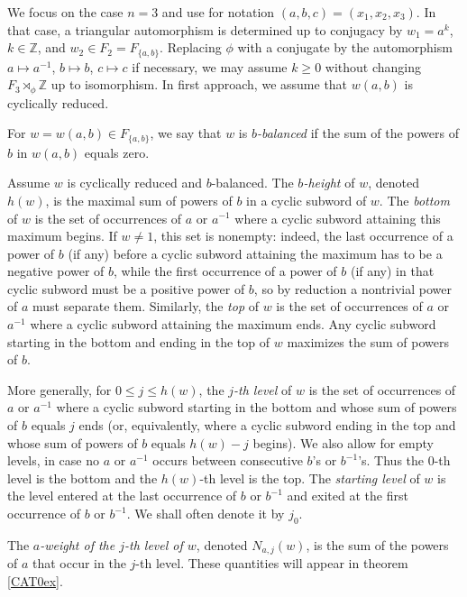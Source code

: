 \documentclass  [a4paper, 11pts] {article}
\newcommand{\Z}{\mathbb{Z}}
\begin{document}
We focus on the case $n=3$ and use for notation $(a, b, c) = (x_1, x_2, x_3)$. In that case, a triangular automorphism is determined up to conjugacy by $w_1 = a^k$, $k\in \Z$, and $w_2\in F_2 = F_{\{a, b\}}$. Replacing $\phi$ with a conjugate by the automorphism $a\mapsto a^{-1}$, $b\mapsto b$, $c\mapsto c$ if necessary, we may assume $k\ge 0$ without changing $F_3\rtimes_\phi\Z$ up to isomorphism. In first approach, we assume that $w(a,b)$ is cyclically reduced.

For $w = w(a, b)\in F_{\{a, b\}}$, we say that $w$ is \emph{$b$-balanced} if the sum of the powers of $b$ in $w(a, b)$ equals zero.

Assume $w$ is cyclically reduced and $b$-balanced. The \emph{$b$-height} of $w$, denoted $h(w)$, is the maximal sum of powers of $b$ in a cyclic subword of $w$. The \emph{bottom} of $w$ is the set of occurrences of $a$ or $a^{-1}$ where a cyclic subword attaining this maximum begins. If $w\ne 1$, this set is nonempty: indeed, the last occurrence of a power of $b$ (if any) before a cyclic subword attaining the maximum has to be a negative power of $b$, while the first occurrence of a power of $b$ (if any) in that cyclic subword must be a positive power of $b$, so by reduction a nontrivial power of $a$ must separate them. Similarly, the \emph{top} of $w$ is the set of occurrences of $a$ or $a^{-1}$ where a cyclic subword attaining the maximum ends. Any cyclic subword starting in the bottom and ending in the top of $w$ maximizes the sum of powers of $b$.

More generally, for $0\le j\le h(w)$, the \emph{$j$-th level} of $w$ is the set of occurrences of $a$ or $a^{-1}$ where a cyclic subword starting in the bottom and whose sum of powers of $b$ equals $j$ ends (or, equivalently, where a cyclic subword ending in the top and whose sum of powers of $b$ equals $h(w)-j$ begins). We also allow for empty levels, in case no $a$ or $a^{-1}$ occurs between consecutive $b$'s or $b^{-1}$'s. Thus the $0$-th level is the bottom and the $h(w)$-th level is the top. The \emph{starting level} of $w$ is the level entered at the last occurrence of $b$ or $b^{-1}$ and exited at the first occurrence of $b$ or $b^{-1}$. We shall often denote it by $j_0$.

The \emph{$a$-weight of the $j$-th level of $w$}, denoted $N_{a,j}(w)$, is the sum of the powers of $a$ that occur in the $j$-th level. These quantities will appear in theorem \ref{CAT0ex}.
\end{document}
